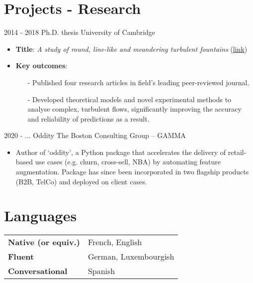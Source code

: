 \documentclass[letterpaper]{twentysecondcv} %
\begin{document}
	\section{Projects - Research}{\faClipboard}
	\begin{twenty}		
		\twentyitem
		{2014 - 2018}
		{}
		{Ph.D. thesis}
		{University of Cambridge}
		{}
		{\vspace{-2mm}
				\begin{itemize}[topsep=0pt,partopsep=0pt]
				\item \textbf{Title}: \textit{A study of round, line-like and meandering turbulent fountains} (\href{https://www.repository.cam.ac.uk/handle/1810/284881}{link})
				\item \textbf{Key outcomes}:
					\begin{itemize}
						\item[-] Published four research articles in field's leading peer-reviewed journal.
						\item[-] Developed theoretical models and novel experimental methods to analyse complex, turbulent flows, significantly improving the accuracy and reliability of predictions as a result.
					\end{itemize}					
		\end{itemize}
	}
	
	\twentyitem
	{2020 - ...}
	{}
	{Oddity}
	{The Boston Consulting Group -- GAMMA}
	{}
	{\vspace{-2mm}
		\begin{itemize}[topsep=0pt,partopsep=0pt]
			\item Author of `oddity', a Python package that accelerates the delivery of retail-based use cases (e.g. churn, cross-sell, NBA) by automating feature augmentation. Package has since been incorporated in two flagship products (B2B, TelCo) and deployed on client cases.
		\end{itemize}
	}
	\end{twenty}

	\section{Languages}{\faGlobe}
	

	\hspace{6mm}	
	\begin{tabular}{p{3.5cm} p{5cm}}
		\textbf{Native (or equiv.)} & French, English \\
		\textbf{Fluent} & German, Luxembourgish\\
		\textbf{Conversational} & Spanish
	\end{tabular}
\end{document}
